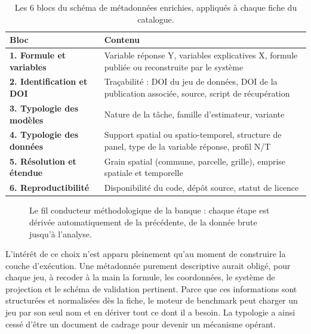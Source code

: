 \documentclass[11pt,a4paper]{article}
\begin{document}
\begin{table}[h]
\centering
\small
\begin{tabularx}{\textwidth}{>{\bfseries}p{4.3cm} X}
\toprule
Bloc & Contenu \\
\midrule
1. Formule et variables & Variable réponse Y, variables explicatives X, formule publiée ou reconstruite par le système \\
2. Identification et DOI & Traçabilité : DOI du jeu de données, DOI de la publication associée, source, script de récupération \\
3. Typologie des modèles & Nature de la tâche, famille d'estimateur, variante \\
4. Typologie des données & Support spatial ou spatio-temporel, structure de panel, type de la variable réponse, profil N/T \\
5. Résolution et étendue & Grain spatial (commune, parcelle, grille), emprise spatiale et temporelle \\
6. Reproductibilité & Disponibilité du code, dépôt source, statut de licence \\
\bottomrule
\end{tabularx}
\caption{Les 6 blocs du schéma de métadonnées enrichies, appliqués à chaque fiche du catalogue.}
\label{tab:six-blocs}
\end{table}

\begin{figure}[h]
\centering
{}
\caption{Le fil conducteur méthodologique de la banque : chaque étape est dérivée automatiquement de la précédente, de la donnée brute jusqu'à l'analyse.}
\label{fig:chaine-methodologique}
\end{figure}

L'intérêt de ce choix n'est apparu pleinement qu'au moment de construire la couche d'exécution. Une métadonnée purement descriptive aurait obligé, pour chaque jeu, à recoder à la main la formule, les coordonnées, le système de projection et le schéma de validation pertinent. Parce que ces informations sont structurées et normalisées dès la fiche, le moteur de benchmark peut charger un jeu par son seul nom et en dériver tout ce dont il a besoin. La typologie a ainsi cessé d'être un document de cadrage pour devenir un mécanisme opérant.
\end{document}
